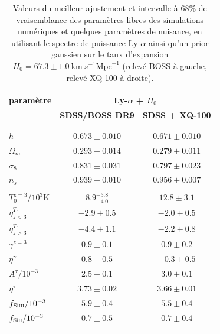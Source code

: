 \begin{table}
\begin{center}
\begin{tabular}{lcc}
\hline \\[-10pt]
\textbf{paramètre} & \multicolumn{2}{c}{\textbf{Ly-$\alpha$ + $H_0$}} \\[2pt]
 & \textbf{SDSS/BOSS DR9} & \textbf{SDSS + XQ-100}\\[2pt]
\hline \\[-10pt]
\\ [2pt]
$h$ & $0.673 \pm 0.010$ & $0.671 \pm 0.010$ \\[2pt]
$\Omega_m$ & $0.293 \pm 0.014$ & $0.279 \pm 0.011$ \\[2pt]
$\sigma_8$ & $0.831 \pm 0.031$ & $0.797 \pm 0.023$ \\[2pt]
$n_s$ & $0.939 \pm 0.010$ & $0.956 \pm 0.007$ \\[2pt]
\hline \\[-10pt]
$T_0^{z=3}/10^3\mathrm{K}$ & $8.9^{+3.8}_{-4.0}$ & $12.8 \pm 3.1$ \\[2pt]
$\eta^{T_0}_{z<3}$ & $-2.9 \pm 0.5$ & $-2.0 \pm 0.5$ \\[2pt]
$\eta^{T_0}_{z>3}$ & $-4.4 \pm 1.1$ & $-2.2 \pm 0.8$ \\[2pt]
$\gamma^{z=3}$ & $0.9 \pm 0.1$ & $0.9 \pm 0.2$ \\[2pt]
$\eta^{\gamma}$ & $0.8 \pm 0.5$ & $-0.3 \pm 0.5$ \\[2pt]
$A^{\tau}/10^{-3}$ & $2.5 \pm 0.1$ & $3.0 \pm 0.1$ \\[2pt]
$\eta^{\tau}$ & $3.73 \pm 0.02$ & $3.66 \pm 0.01$ \\[2pt]
$f_{\mathrm{Si}\textsc{iii}}/10^{-3}$ & $5.9 \pm 0.4$ & $5.5 \pm 0.4$ \\[2pt]
$f_{\mathrm{Si}\textsc{ii}}/10^{-3}$ & $0.7 \pm 0.5$ & $0.7 \pm 0.4$ \\[2pt]
\hline \\[-10pt]
\end{tabular}
\caption{Valeurs du meilleur ajustement et intervalle à $68\%$ de vraisemblance des paramètres libres des simulations numériques et quelques paramètres de nuisance, en utilisant le spectre de puissance Ly-$\alpha$ ainsi qu'un prior gaussien sur le taux d'expansion $H_0 = 67.3 \pm 1.0~\mathrm{km}~s^{-1}\mathrm{Mpc}^{-1}$ (relevé BOSS à gauche, relevé XQ-100 à droite).}
\label{tab:best_fit}
\end{center}
\end{table}

